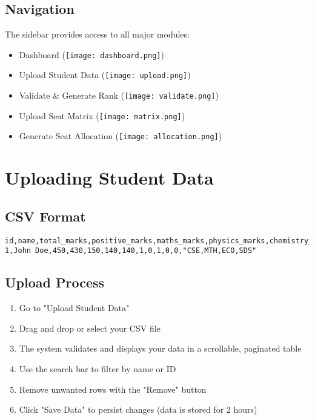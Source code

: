 \documentclass[12pt]{article}
\begin{document}
\subsection{Navigation}
The sidebar provides access to all major modules:
\begin{itemize}
    \item Dashboard (\texttt{[image: dashboard.png]})
    \item Upload Student Data (\texttt{[image: upload.png]})
    \item Validate \& Generate Rank (\texttt{[image: validate.png]})
    \item Upload Seat Matrix (\texttt{[image: matrix.png]})
    \item Generate Seat Allocation (\texttt{[image: allocation.png]})
\end{itemize}

\section{Uploading Student Data}
\subsection{CSV Format}
\begin{lstlisting}
id,name,total_marks,positive_marks,maths_marks,physics_marks,chemistry_marks,imotc,ioitc,inpho,incho,inbo,preference_order
1,John Doe,450,430,150,140,140,1,0,1,0,0,"CSE,MTH,ECO,SDS"
\end{lstlisting}

\subsection{Upload Process}
\begin{enumerate}
    \item Go to "Upload Student Data"
    \item Drag and drop or select your CSV file
    \item The system validates and displays your data in a scrollable, paginated table
    \item Use the search bar to filter by name or ID
    \item Remove unwanted rows with the "Remove" button
    \item Click "Save Data" to persist changes (data is stored for 2 hours)
\end{enumerate}
\end{document}
